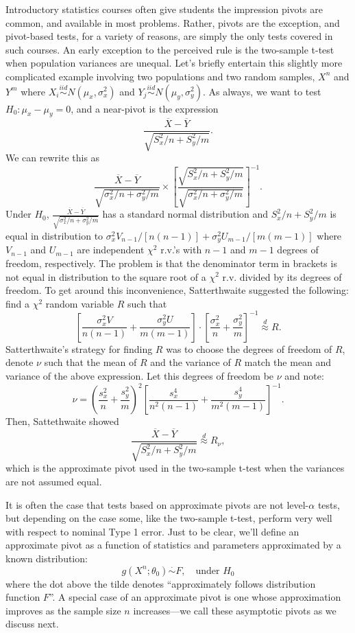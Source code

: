 \documentclass[
]{book}
\theoremstyle{definition}
\theoremstyle{definition}
\theoremstyle{definition}
\theoremstyle{definition}
\theoremstyle{remark}
\begin{document}
Introductory statistics courses often give students the impression pivots are common, and available in most problems. Rather, pivots are the exception, and pivot-based tests, for a variety of reasons, are simply the only tests covered in such courses. An early exception to the perceived rule is the two-sample t-test when population variances are unequal. Let's briefly entertain this slightly more complicated example involving two populations and two random samples, \(X^n\) and \(Y^m\) where \(X_i\stackrel{iid}{\sim}N(\mu_x, \sigma_x^2)\) and \(Y_j\stackrel{iid}{\sim}N(\mu_y, \sigma_y^2)\). As always, we want to test \(H_0:\mu_x-\mu_y = 0\), and a near-pivot is the expression
\[\frac{\overline X - \overline Y}{\sqrt{S_x^2/n + S_y^2/m}}.\]
We can rewrite this as
\[\frac{\overline X - \overline Y}{\sqrt{\sigma_x^2/n + \sigma_y^2/m}} \times \left[\frac{\sqrt{S_x^2/n + S_y^2/m}}{\sqrt{\sigma_x^2/n + \sigma_y^2/m}}\right]^{-1}.\]
Under \(H_0\), \(\frac{\overline X - \overline Y}{\sqrt{\sigma_x^2/n + \sigma_y^2/m}}\) has a standard normal distribution and \(S_x^2/n + S_y^2/m\) is equal in distribution to \(\sigma_x^2 V_{n-1} /[n(n-1)] + \sigma_y^2 U_{m-1} /[m(m-1)]\) where \(V_{n-1}\) and \(U_{m-1}\) are independent \(\chi^2\) r.v.'s with \(n-1\) and \(m-1\) degrees of freedom, respectively. The problem is that the denominator term in brackets is not equal in distribution to the square root of a \(\chi^2\) r.v. divided by its degrees of freedom. To get around this inconvenience, Satterthwaite suggested the following: find a \(\chi^2\) random variable \(R\) such that
\[\left[\frac{\sigma_x^2 V}{n(n-1)} + \frac{\sigma_y^2 U}{m(m-1)}\right]\cdot \left[\frac{\sigma_x^2}{n} + \frac{\sigma_y^2}{m}\right]^{-1}\stackrel{d}{\approx} R.\]
Satterthwaite's strategy for finding \(R\) was to choose the degrees of freedom of \(R\), denote \(\nu\) such that the mean of \(R\) and the variance of \(R\) match the mean and variance of the above expression. Let this degrees of freedom be \(\nu\) and note:
\[\nu = \left(\frac{s_x^2}{n} + \frac{s_y^2}{m}\right)^2\left[\frac{s_x^4}{n^2(n-1)}+\frac{s_y^4}{m^2(m-1)}\right]^{-1}.\]
Then, Sattethwaite showed
\[\frac{\overline X - \overline Y}{\sqrt{S_x^2/n + S_y^2/m}}\stackrel{d}{\approx} R_\nu,\]
which is the approximate pivot used in the two-sample t-test when the variances are not assumed equal.

It is often the case that tests based on approximate pivots are not level-\(\alpha\) tests, but depending on the case some, like the two-sample t-test, perform very well with respect to nominal Type 1 error. Just to be clear, we'll define an approximate pivot as a function of statistics and parameters approximated by a known distribution:
\[g(X^n; \theta_0)\stackrel{\cdot}{\sim} F, \quad \text{under }H_0\]
where the dot above the tilde denotes ``approximately follows distribution function \(F\)''. A special case of an approximate pivot is one whose approximation improves as the sample size \(n\) increases---we call these asymptotic pivots as we discuss next.
\end{document}
